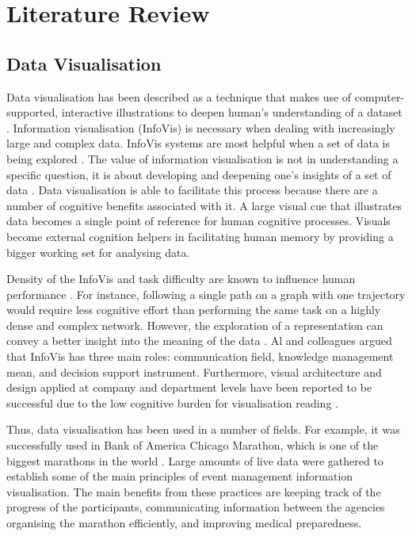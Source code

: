 \documentclass{l4proj}
\begin{document}
\chapter{Literature Review}

\section{Data Visualisation}

Data visualisation has been described as a technique that makes use of computer-supported, interactive illustrations to deepen human's understanding of a dataset \cite{card1999readings}. Information visualisation (InfoVis) is necessary when dealing with increasingly large and complex data. InfoVis systems are most helpful when a set of data is being explored \cite{fekete2008value}. The value of information visualisation is not in understanding a specific question, it is about developing and deepening one's insights of a set of data \cite{fekete2008value}. Data visualisation is able to facilitate this process because there are a number of cognitive benefits associated with it. A large visual cue that illustrates data becomes a single point of reference for human cognitive processes. Visuals become external cognition helpers in facilitating human memory by providing a bigger working set for analysing data. 

Density of the InfoVis and task difficulty are known to influence human performance \cite{netzel2014comparative}. For instance, following a single path on a graph with one trajectory would require less cognitive effort than performing the same task on a highly dense and complex network. However, the exploration of a representation can convey a better insight into the meaning of the data \cite{al2014information}. Al and colleagues \cite{al2014information} argued that InfoVis has three main roles: communication field, knowledge management mean, and decision support instrument. Furthermore, visual architecture and design applied at company and department levels have been reported to be successful due to the low cognitive burden for visualisation reading \cite{king2016cognitive}.

Thus, data visualisation has been used in a number of fields. For example, it was successfully used in Bank of America Chicago Marathon, which is one of the biggest marathons in the world \cite{hanken2016developing}. Large amounts of live data were gathered to establish some of the main principles of event management information visualisation. The main benefits from these practices are keeping track of the progress of the participants, communicating information between the agencies organising the marathon efficiently, and improving medical preparedness. 
\end{document}
